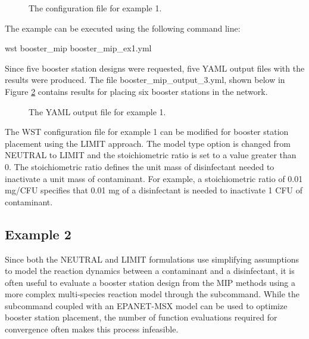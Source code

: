 \begin{figure}[h]
  \caption{The  configuration file for example 1.}
  \label{fig:booster_mip_ex1}
\end{figure}

The example can be executed using the following command line:
\begin{unknownListing}
wst booster_mip booster_mip_ex1.yml
\end{unknownListing}

Since five booster station designs were requested, five YAML output files with the results were produced.
The file {\outputprefix}booster\_mip\_output\_3.yml, shown below in Figure \ref{fig:booster_mip_ex1_output} 
contains results for placing six booster stations in the network. 

\begin{figure}[h]
  \caption{The  YAML output file for example 1.}
  \label{fig:booster_mip_ex1_output}
\end{figure}

The WST configuration file for example 1 can be modified for booster station 
placement using the LIMIT approach. The model type option is changed 
from NEUTRAL to LIMIT and the stoichiometric ratio is set to a value greater than 0. 
The stoichiometric ratio defines the unit mass of disinfectant needed to inactivate a unit mass of 
contaminant. For example, a stoichiometric ratio of 0.01 mg/CFU specifies that 0.01 mg of a disinfectant 
is needed to inactivate 1 CFU of contaminant.

\FloatBarrier 
\subsection{Example 2}

Since both the NEUTRAL and LIMIT formulations use simplifying assumptions 
to model the reaction dynamics between a contaminant and a disinfectant, it is often useful 
to evaluate a booster station design from the MIP methods using a more complex multi-species reaction model 
through the  subcommand. While the  subcommand coupled with an 
EPANET-MSX model can be used to optimize booster station placement, the number of function 
evaluations required for convergence often makes this process infeasible.

